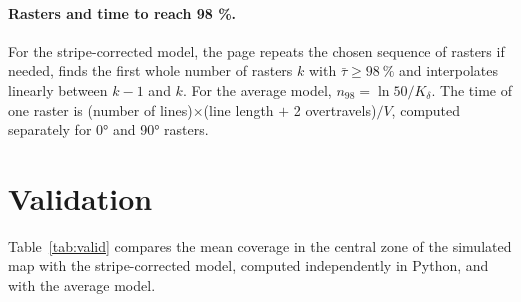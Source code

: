 \documentclass[11pt,a4paper]{article}
\begin{document}
\paragraph{Rasters and time to reach 98 \%.} For the stripe-corrected model, the page repeats the chosen sequence of rasters if needed, finds the first whole number of rasters $k$ with $\bar\tau\ge\SI{98}{\percent}$ and interpolates linearly between $k-1$ and $k$. For the average model, $n_{98}=\ln 50/K_\delta$. The time of one raster is (number of lines)$\times$(line length $+$ 2 overtravels)$/V$, computed separately for 0° and 90° rasters.

\section{Validation}

Table~\ref{tab:valid} compares the mean coverage in the central zone of the simulated map with the stripe-corrected model, computed independently in Python, and with the average model.
\end{document}
